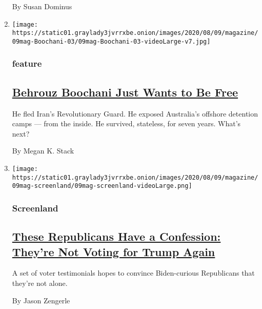 \begin{enumerate}
  By Susan Dominus
\item
  \texttt{[image: https://static01.graylady3jvrrxbe.onion/images/2020/08/09/magazine/09mag-Boochani-03/09mag-Boochani-03-videoLarge-v7.jpg]}

  \hypertarget{feature}{%
  \subsubsection{feature}\label{feature}}

  \hypertarget{behrouz-boochani-just-wants-to-be-free}{%
  \subsection{\texorpdfstring{\href{/2020/08/04/magazine/behrouz-boochani-australia.html}{Behrouz
  Boochani Just Wants to Be
  Free}}{Behrouz Boochani Just Wants to Be Free}}\label{behrouz-boochani-just-wants-to-be-free}}

  He fled Iran's Revolutionary Guard. He exposed Australia's offshore
  detention camps --- from the inside. He survived, stateless, for seven
  years. What's next?

  By Megan K. Stack
\item
  \texttt{[image: https://static01.graylady3jvrrxbe.onion/images/2020/08/09/magazine/09mag-screenland/09mag-screenland-videoLarge.png]}

  \hypertarget{screenland}{%
  \subsubsection{Screenland}\label{screenland}}

  \hypertarget{these-republicans-have-a-confession-theyre-not-voting-for-trump-again}{%
  \subsection{\texorpdfstring{\href{/2020/08/05/magazine/republicans-confess-against-trump.html}{These
  Republicans Have a Confession: They're Not Voting for Trump
  Again}}{These Republicans Have a Confession: They're Not Voting for Trump Again}}\label{these-republicans-have-a-confession-theyre-not-voting-for-trump-again}}

  A set of voter testimonials hopes to convince Biden-curious
  Republicans that they're not alone.

  By Jason Zengerle
\end{enumerate}

